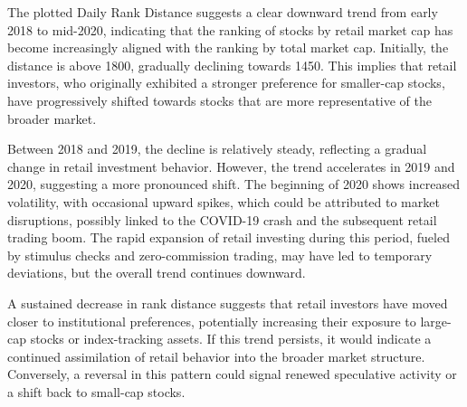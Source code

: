 The plotted Daily Rank Distance suggests a clear downward trend from early 2018 to mid-2020, indicating that the ranking of stocks by retail market cap has become increasingly aligned with the ranking by total market cap. Initially, the distance is above 1800, gradually declining towards 1450. This implies that retail investors, who originally exhibited a stronger preference for smaller-cap stocks, have progressively shifted towards stocks that are more representative of the broader market.

Between 2018 and 2019, the decline is relatively steady, reflecting a gradual change in retail investment behavior. However, the trend accelerates in 2019 and 2020, suggesting a more pronounced shift. The beginning of 2020 shows increased volatility, with occasional upward spikes, which could be attributed to market disruptions, possibly linked to the COVID-19 crash and the subsequent retail trading boom. The rapid expansion of retail investing during this period, fueled by stimulus checks and zero-commission trading, may have led to temporary deviations, but the overall trend continues downward.

A sustained decrease in rank distance suggests that retail investors have moved closer to institutional preferences, potentially increasing their exposure to large-cap stocks or index-tracking assets. If this trend persists, it would indicate a continued assimilation of retail behavior into the broader market structure. Conversely, a reversal in this pattern could signal renewed speculative activity or a shift back to small-cap stocks.
